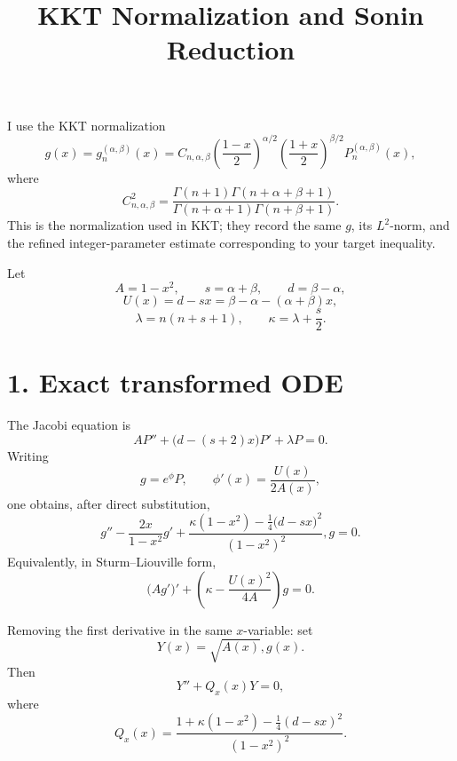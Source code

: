 \documentclass[11pt]{article}
\title{KKT Normalization and Sonin Reduction}
\author{}
\date{}
\begin{document}
\maketitle
I use the KKT normalization
\begin{equation*}
g(x)=g_n^{(\alpha,\beta)}(x)
=C_{n,\alpha,\beta}
\left(\frac{1-x}{2}\right)^{\alpha/2}
\left(\frac{1+x}{2}\right)^{\beta/2}
P_n^{(\alpha,\beta)}(x),
\end{equation*}
where
\begin{equation*}
C_{n,\alpha,\beta}^2
=
\frac{\Gamma(n+1)\Gamma(n+\alpha+\beta+1)}
{\Gamma(n+\alpha+1)\Gamma(n+\beta+1)}.
\end{equation*}
This is the normalization used in KKT; they record the same \(g\), its \(L^2\)-norm, and the refined integer-parameter estimate corresponding to your target inequality.

Let
\begin{equation*}
A=1-x^2,\qquad s=\alpha+\beta,\qquad d=\beta-\alpha,
\end{equation*}
\begin{equation*}
U(x)=d-sx=\beta-\alpha-(\alpha+\beta)x,
\end{equation*}
\begin{equation*}
\lambda=n(n+s+1),\qquad \kappa=\lambda+\frac{s}{2}.
\end{equation*}

\section*{1. Exact transformed ODE}

The Jacobi equation is
\begin{equation*}
A P''+\bigl(d-(s+2)x\bigr)P'+\lambda P=0.
\end{equation*}
Writing
\begin{equation*}
g=e^\phi P,\qquad
\phi'(x)=\frac{U(x)}{2A(x)},
\end{equation*}
one obtains, after direct substitution,
\begin{equation}
\boxed{
g''-\frac{2x}{1-x^2}g'
+
\frac{\kappa(1-x^2)-\frac14\bigl(d-sx\bigr)^2}{(1-x^2)^2},g=0.
}
\tag{1}
\end{equation}
Equivalently, in Sturm–Liouville form,
\begin{equation}
\boxed{
\bigl(A g'\bigr)'
+
\left(
\kappa-\frac{U(x)^2}{4A}
\right)g=0.
}
\tag{2}
\end{equation}

Removing the first derivative in the same \(x\)-variable: set
\begin{equation*}
Y(x)=\sqrt{A(x)},g(x).
\end{equation*}
Then
\begin{equation}
\boxed{
Y''+Q_x(x)Y=0,
}
\tag{3}
\end{equation}
where
\begin{equation}
\boxed{
Q_x(x)
=
\frac{
1+\kappa(1-x^2)-\frac14(d-sx)^2
}
{(1-x^2)^2}.
}
\tag{4}
\end{equation}
\end{document}
